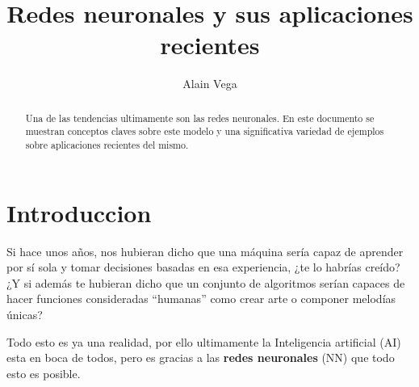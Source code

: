 \documentclass[runningheads]{llncs} %
\begin{document}
\title{Redes neuronales y sus aplicaciones recientes}

%
\author{Alain Vega \\ }
%
%
%
\maketitle              %
%
\begin{abstract}
Una de las tendencias ultimamente son las redes neuronales. En este documento
se muestran conceptos claves sobre este modelo y una significativa variedad
de ejemplos sobre aplicaciones recientes del mismo.

\end{abstract}
\section{Introduccion}
Si hace unos años, nos hubieran dicho que una máquina sería capaz de aprender 
por sí sola y tomar decisiones basadas en esa experiencia, ¿te lo habrías creído? 
¿Y si además te hubieran dicho que un conjunto de algoritmos serían capaces de
hacer funciones consideradas \textquotedblleft{humanas}\textquotedblright{}
como crear arte o componer melodías únicas? \cite{int1}

Todo esto es ya una realidad, por ello ultimamente la Inteligencia artificial (AI) 
esta en boca de todos, pero es gracias a las \textbf{redes neuronales} (NN)
que todo esto es posible. 
\end{document}
